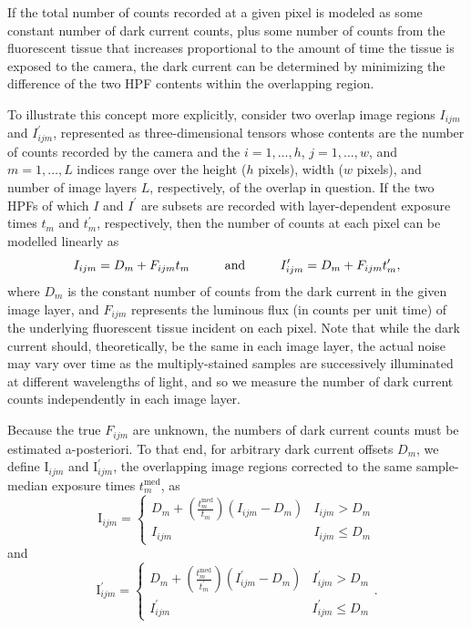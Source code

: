 \documentclass[letterpaper,11pt]{article}
\newcommand{\Iota}{\mathrm{I}}
\begin{document}
If the total number of counts recorded at a given pixel is modeled as some constant number of dark current counts, plus some number of counts from the fluorescent tissue that increases proportional to the amount of time the tissue is exposed to the camera, the dark current can be determined by minimizing the difference of the two HPF contents within the overlapping region.

To illustrate this concept more explicitly, consider two overlap image regions $I_{ijm}$ and $I^{\prime}_{ijm}$, represented as three-dimensional tensors whose contents are the number of counts recorded by the camera and the $i=1, \ldots, h$, $j = 1, \ldots, w$, and $m = 1, \ldots, L$ indices range over the height ($h$ pixels), width ($w$ pixels), and number of image layers $L$, respectively, of the overlap in question. If the two HPFs of which $I$ and $I^{\prime}$ are subsets are recorded with layer-dependent exposure times $t_{m}$ and $t^{\prime}_{m}$, respectively, then the number of counts at each pixel can be modelled linearly as
\begin{equation}
I_{ijm} = D_{m} + F_{ijm} t_{m} \hspace{0.08\textwidth} \mathrm{and} \hspace{0.08\textwidth} I^{\prime}_{ijm} = D_{m} + F_{ijm} t^{\prime}_{m},
\end{equation}
where $D_{m}$ is the constant number of counts from the dark current in the given image layer, and $F_{ijm}$ represents the luminous flux (in counts per unit time) of the underlying fluorescent tissue incident on each pixel. Note that while the dark current should, theoretically, be the same in each image layer, the actual noise may vary over time as the multiply-stained samples are successively illuminated at different wavelengths of light, and so we measure the number of dark current counts independently in each image layer.

Because the true $F_{ijm}$ are unknown, the numbers of dark current counts must be estimated a-posteriori. To that end, for arbitrary dark current offsets $D_{m}$, we define $\Iota_{ijm}$ and $\Iota^{\prime}_{ijm}$, the overlapping image regions corrected to the same sample-median exposure times $t_{m}^{\mathrm{med}}$, as
\begin{equation}
\Iota_{ijm} = 
\begin{cases} 
      D_{m}+\left(\frac{t_{m}^{\mathrm{med}}}{t_{m}}\right)\left(I_{ijm}-D_{m}\right) & I_{ijm} > D_{m}  \\
      I_{ijm} & I_{ijm} \leq D_{m} 
\end{cases}
\label{eq:image_corr_def_1}
\end{equation}
and
\begin{equation}
\Iota^{\prime}_{ijm} = 
\begin{cases} 
      D_{m}+\left(\frac{t_{m}^{\mathrm{med}}}{t^{\prime}_{m}}\right)\left(I^{\prime}_{ijm}-D_{m}\right) & I^{\prime}_{ijm} > D_{m}  \\
      I^{\prime}_{ijm} & I^{\prime}_{ijm} \leq D_{m} 
\end{cases}
.
\label{eq:image_corr_def_2}
\end{equation}
\end{document}
